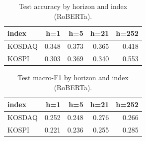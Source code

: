 \begin{table}[t]\centering
\caption{Test accuracy by horizon and index (RoBERTa).}
\begin{tabular}{lrrrr}
\toprule
index & h=1 & h=5 & h=21 & h=252 \\
\midrule
KOSDAQ & 0.348 & 0.373 & 0.365 & 0.418 \\
KOSPI & 0.303 & 0.369 & 0.340 & 0.553 \\
\bottomrule
\end{tabular}
\end{table}

\begin{table}[t]\centering
\caption{Test macro-F1 by horizon and index (RoBERTa).}
\begin{tabular}{lrrrr}
\toprule
index & h=1 & h=5 & h=21 & h=252 \\
\midrule
KOSDAQ & 0.252 & 0.248 & 0.276 & 0.266 \\
KOSPI & 0.221 & 0.236 & 0.255 & 0.285 \\
\bottomrule
\end{tabular}
\end{table}
